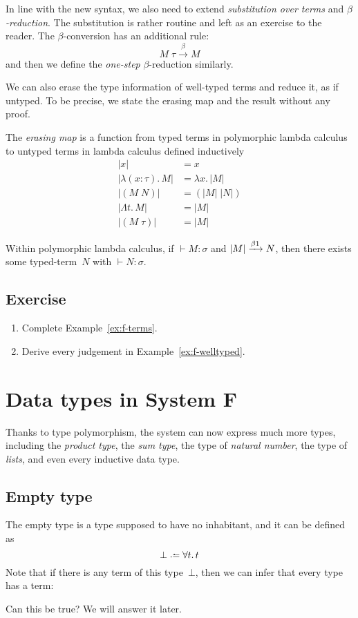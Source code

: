 In line with the new syntax, we also need to extend \emph{substitution over
  terms} and \emph{$\beta$-reduction}. The substitution is rather routine and
left as an exercise to the reader.  The $\beta$-conversion has an additional
rule:
\[
  M\;\tau \xrightarrow{\beta} M
\]
and then we define the \emph{one-step} $\beta$-reduction similarly.

We can also erase the type information of well-typed terms and reduce it, as if
untyped. To be precise, we state the erasing map and the result without any
proof.
\begin{definition}
  The \emph{erasing map} is a function from typed terms in polymorphic lambda
  calculus to untyped terms in lambda calculus defined inductively 
  \begin{align*}
    |x| & = x \\
    |\lambda (x : \tau).\,M| & = \lambda x.\, |M| \\
    |(M\;N)| & = (|M|\;|N|) \\
    |\Lambda t.\, M| & = |M| \\
    |(M\;\tau)| & = |M|
  \end{align*}
\end{definition}
\begin{theorem}
  Within polymorphic lambda calculus, if ${}\vdash M : \sigma$ and $|M|
  \onereduce N$, then there exists some typed-term~$N$ with
  ${}\vdash N : \sigma$.
\end{theorem}
\subsection*{Exercise}
\begin{enumerate}
  \item Complete Example~\ref{ex:f-terms}.
  \item Derive every judgement in Example~\ref{ex:f-welltyped}.
\end{enumerate}
\section{Data types in System F}
Thanks to type polymorphism, the system can now express much more types,
including the \emph{product type}, the \emph{sum type}, the type of
\emph{natural number}, the type of \emph{lists}, and even every inductive data
type.
\subsection{Empty type}
The empty type is a type supposed to have no inhabitant, and it can be defined
as
\[
  \bot \defeq \forall t.\,t
\]
Note that if there is any term of this type~$\bot$, then we can infer that every
type has a term:
\begin{prooftree}
\end{prooftree}
Can this be true? We will answer it later.
